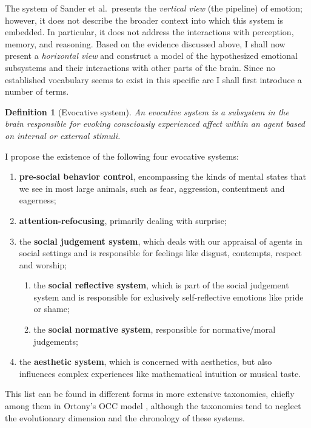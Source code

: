 \documentclass[]{scrartcl}
\theoremstyle{break}
\newtheorem{definition}{Definition}
\begin{document}
The system of Sander et al.\ presents the {\em vertical view} (the pipeline) of emotion; however, it does not describe the broader context into which this system is embedded. In particular, it does not address the interactions with perception, memory, and reasoning. Based on the evidence discussed above, I shall now present a {\em horizontal view} and construct a model of the hypothesized emotional subsystems and their interactions with other parts of the brain. Since no established vocabulary seems to exist in this specific are I shall first introduce a number of terms.

\begin{definition}[Evocative system]
An evocative system is a subsystem in the brain responsible for evoking consciously experienced affect within an agent based on internal or external stimuli.
\end{definition} 

I propose the existence of the following four evocative systems:

\begin{enumerate}
	\item \textbf{pre-social behavior control}, encompassing the kinds of mental states that we see in most large animals, such as fear, aggression, contentment and eagerness;
	\item \textbf{attention-refocusing}, primarily dealing with surprise;
	\item the \textbf{social judgement system}, which deals with our appraisal of agents in social settings and is responsible for feelings like disgust, contempts, respect and worship;
		\begin{enumerate}
				\item the \textbf{social reflective system}, which is part of the social judgement system and is responsible for exlusively self-reflective emotions like pride or shame;
				\item the \textbf{social normative system}, responsible for normative/moral judgements;
		\end{enumerate}
	\item the \textbf{aesthetic system}, which is concerned with aesthetics, but also influences complex experiences like mathematical intuition or musical taste.
\end{enumerate}

This list can be found in different forms in more extensive taxonomies, chiefly among them in Ortony's OCC model \cite{ortony1988}, although the taxonomies tend to neglect the evolutionary dimension and the chronology of these systems.
\end{document}
